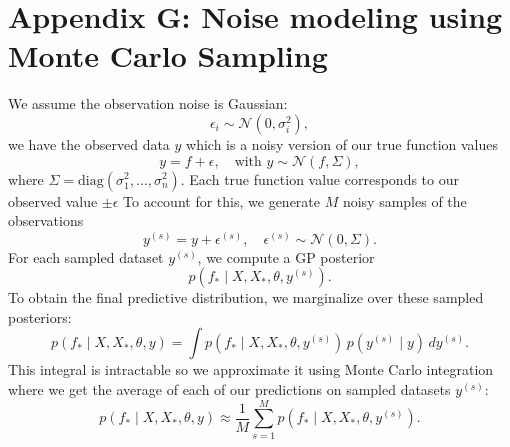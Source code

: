 \documentclass[10pt]{article}
\begin{document}
\section{Appendix G: Noise modeling using Monte Carlo Sampling}
\label{appendix:monte_carlo}

We assume the observation noise is Gaussian:
\[
\epsilon_i \sim \mathcal{N}(0, \sigma_i^2),
\]
we have the observed data \( y \) which is a noisy version of our true function values
\[
y = f + \epsilon, \quad \text{with } y \sim \mathcal{N}(f, \Sigma),
\]
where \( \Sigma = \mathrm{diag}(\sigma_1^2, \dots, \sigma_n^2) \).
Each true function value corresponds to our observed value \(\pm \epsilon\)
To account for this, we generate \( M \) noisy samples of the observations
\begin{equation}
    y^{(s)} = y + \epsilon^{(s)}, \quad \epsilon^{(s)} \sim \mathcal{N}(0, \Sigma).
\end{equation}
For each sampled dataset \( y^{(s)} \), we compute a GP posterior
\begin{equation}
    p(f_* \mid X, X_*, \theta, y^{(s)}).
\end{equation}
To obtain the final predictive distribution, we marginalize over these sampled posteriors:
\begin{equation}
    p(f_* \mid X, X_*, \theta, y) = \int p(f_* \mid X, X_*, \theta, y^{(s)}) \, p(y^{(s)} \mid y) \, dy^{(s)}.
\end{equation}
This integral is intractable so we approximate it using Monte Carlo integration where we get the average of each of our predictions on sampled datasets \(y^{(s)}\):
\begin{equation}
    p(f_* \mid X, X_*, \theta, y) \approx \frac{1}{M} \sum_{s=1}^{M} p(f_* \mid X, X_*, \theta, y^{(s)}).
\end{equation}

% 
% 
 
\end{document}
